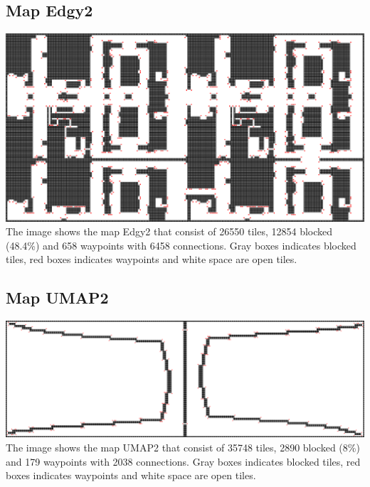 \documentclass[sigconf]{acmart}
\begin{document}
\subsection{Map Edgy2}\label{ap.edgy2}
\includegraphics[scale=0.3]{ChartsAndFigures/Edgy2.png}
The image shows the map Edgy2 that consist of 26550 tiles, 12854 blocked (48.4\%) and 658 waypoints with 6458 connections. Gray boxes indicates blocked tiles, red boxes indicates waypoints and white space are open tiles.

\subsection{Map UMAP2}\label{ap.umap2}
\includegraphics[scale=0.2]{ChartsAndFigures/UMAP2.png}
The image shows the map UMAP2 that consist of 35748 tiles, 2890 blocked (8\%) and 179 waypoints with 2038 connections. Gray boxes indicates blocked tiles, red boxes indicates waypoints and white space are open tiles.
\end{document}
